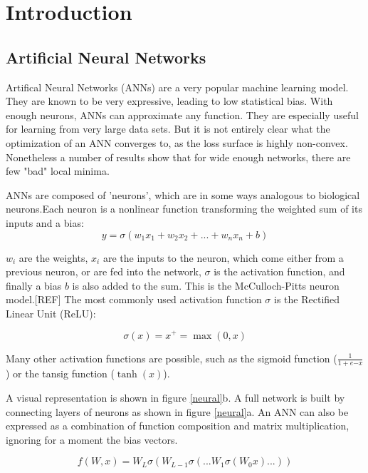 \chapter{Introduction}
\section{Artificial Neural Networks}

Artifical Neural Networks (ANNs) are a very popular machine learning model. They are known to be very expressive, leading to low statistical bias. With enough neurons, ANNs can approximate any function.  They are especially useful for learning from very large data sets. But it is not entirely clear what the optimization of an ANN converges to, as the loss surface is highly non-convex. Nonetheless a number of results show that for wide enough networks, there are few "bad" local minima.

ANNs are composed of 'neurons', which are in some ways analogous to biological neurons.Each neuron is a nonlinear function transforming the weighted sum of its inputs and a bias:
\begin{equation}
      y = \sigma(w_1x_1+w_2x_2+...+w_nx_n + b)
\end{equation}

$w_i$ are the weights, $x_i$ are the inputs to the neuron, which come either from a previous neuron, or are fed into the network, $\sigma$ is the activation function, and finally a bias $b$ is also added to the sum. This is the McCulloch-Pitts neuron model.[REF] The most commonly used activation function $\sigma$ is the Rectified Linear Unit (ReLU):

\begin{equation}
      \sigma(x) = x^+ = \max(0,x)
\end{equation}

Many other activation functions are possible, such as the sigmoid function ($\frac{1}{1+e{-x}}$) or the tansig function ($\tanh(x)$).

A visual representation is shown in figure \ref{neural}b. A full network is built by connecting layers of neurons as shown in figure \ref{neural}a. An ANN can also be expressed as a combination of function composition and matrix multiplication, ignoring for a moment the bias vectors.

\begin{equation}
         f(W,x) = W_L\sigma(W_{L-1}\sigma(...W_1\sigma(W_0x)...))
\end{equation}

